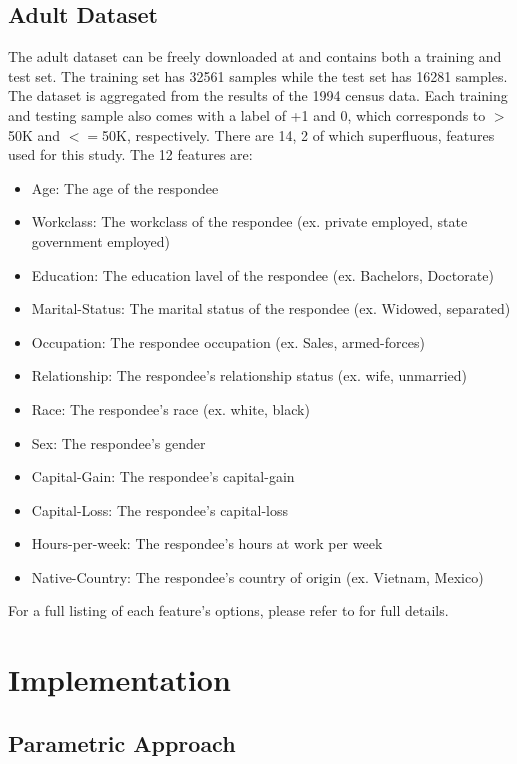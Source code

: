 \documentclass[conference]{IEEEtran}
\begin{document}
\subsection{Adult Dataset}
The adult dataset can be freely downloaded at \cite{UCI} and contains both a training and test set. The training set has 32561 samples while the test set has 16281 samples. The dataset is aggregated from the results of the 1994 census data. Each training and testing sample also comes with a label of +1 and 0, which corresponds to $>$50K and $<=$50K, respectively. There are 14, 2 of which superfluous, features used for this study. The 12 features are:
\begin{itemize}
    \item Age: The age of the respondee
    \item Workclass: The workclass of the respondee (ex. private employed, state government employed)
    \item Education: The education lavel of the respondee (ex. Bachelors, Doctorate)
    \item Marital-Status: The marital status of the respondee (ex. Widowed, separated)
    \item Occupation: The respondee occupation (ex. Sales, armed-forces)
    \item Relationship: The respondee's relationship status (ex. wife, unmarried)
    \item Race: The respondee's race (ex. white, black)
    \item Sex: The respondee's gender
    \item Capital-Gain: The respondee's capital-gain
    \item Capital-Loss: The respondee's capital-loss
    \item Hours-per-week: The respondee's hours at work per week
    \item Native-Country: The respondee's country of origin (ex. Vietnam, Mexico)
\end{itemize}
For a full listing of each feature's options, please refer to \cite{UCI} for full details.
\section{Implementation}
\subsection{Parametric Approach}
\end{document}
